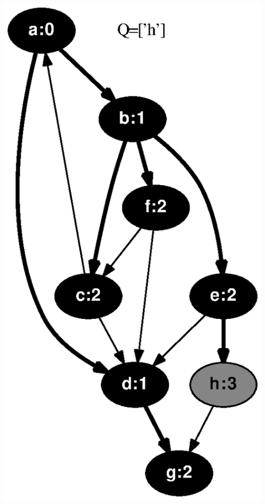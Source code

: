 \documentclass{article}
\begin{document}
\includegraphics[height=.3\textheight]{bfs_directed_classroom_07.eps}
\vspace{1em}
\end{document}
